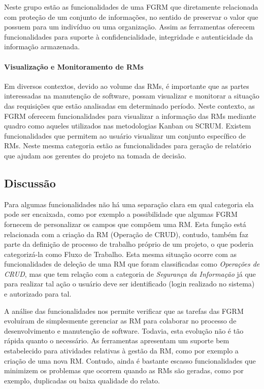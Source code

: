Neste grupo estão as funcionalidades de uma FGRM que diretamente relacionada com
proteção de um conjunto de informações, no sentido de preservar o valor que
possuem para um indivíduo ou uma organização. Assim as ferramentas oferecem
funcionalidades para suporte à confidencialidade, integridade e autenticidade da
informação armazenada.

\paragraph{Visualização e Monitoramento de RMs}
\label{par:visualização_de_rm_s}

Em diversos contextos, devido ao volume das RMs, é importante que as partes
interessadas na manutenção de software, possam visualizar e monitorar a situação
das requisições que estão analisadas em determinado período. Neste contexto, as
FGRM oferecem funcionalidades para visualizar a informação das RMs mediante
quadro como aqueles utilizados nas metodologias Kanban ou SCRUM\@. Existem
funcionalidades que permitem ao usuário visualizar um conjunto específico de
RMs. Neste mesma categoria estão as funcionalidades para geração de relatório
que ajudam aos gerentes do projeto na tomada de decisão.

\subsection{Discussão}
\label{sec:discussao}

Para algumas funcionalidades não há uma separação clara em qual categoria ela
pode ser encaixada, como por exemplo a possibilidade que algumas FGRM fornecem
de personalizar os campos que compõem uma RM\@. Esta função está relacionada com a
criação da RM (Operação de CRUD), contudo, também faz parte da definição de
processo de trabalho próprio de um projeto, o que poderia categorizá-la como
Fluxo de Trabalho. Esta mesma situação ocorre com as funcionalidades de deleção
de uma RM que foram classificadas como \textit{Operações de CRUD}, mas que tem
relação com a categoria de \textit{Segurança da Informação} já que para realizar
tal ação o usuário deve ser identificado (login realizado no sistema) e
autorizado para tal.

A análise das funcionalidades nos permite verificar que as tarefas das FGRM
evoluíram de simplesmente gerenciar as RM para colaborar no processo de
desenvolvimento e manutenção de software. Todavia, esta evolução não é tão
rápida quanto o necessário. As ferramentas apresentam um suporte bem
estabelecido para atividades relativas à gestão da RM, como por exemplo a
criação de uma nova RM\@. Contudo, ainda é bastante escasso funcionalidades que
minimizem os problemas que ocorrem quando as RMs são geradas, como por exemplo,
duplicadas ou baixa qualidade do relato.


